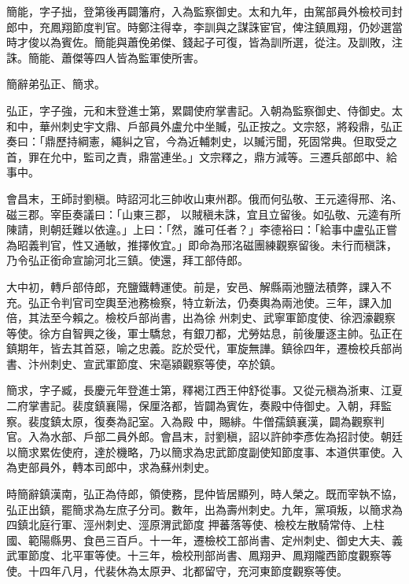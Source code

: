 \begin{pinyinscope}
 簡能，字子拙，登第後再闢籓府，入為監察御史。太和九年，由駕部員外檢校司封郎中，充鳳翔節度判官。時鄭注得幸，李訓與之謀誅宦官，俾注鎮鳳翔，仍妙選當時才俊以為賓佐。簡能與蕭俛弟傑、錢起子可復，皆為訓所選，從注。及訓敗，注誅。簡能、蕭傑等四人皆為監軍使所害。



 簡辭弟弘正、簡求。



 弘正，字子強，元和末登進士第，累闢使府掌書記。入朝為監察御史、侍御史。太和中，華州刺史宇文鼎、戶部員外盧允中坐贓，弘正按之。文宗怒，將殺鼎，弘正奏曰：「鼎歷持綱憲，繩糾之官，今為近輔刺史，以贓污聞，死固常典。但取受之首，罪在允中，監司之責，鼎當連坐。」文宗釋之，鼎方減等。三遷兵部郎中、給事中。



 會昌末，王師討劉稹。時詔河北三帥收山東州郡。俄而何弘敬、王元逵得邢、洺、磁三郡。宰臣奏議曰：「山東三郡，
 以賊稹未誅，宜且立留後。如弘敬、元逵有所陳請，則朝廷難以依違。」上曰：「然，誰可任者？」李德裕曰：「給事中盧弘正嘗為昭義判官，性又通敏，推擇攸宜。」即命為邢洺磁團練觀察留後。未行而稹誅，乃令弘正銜命宣諭河北三鎮。使還，拜工部侍郎。



 大中初，轉戶部侍郎，充鹽鐵轉運使。前是，安邑、解縣兩池鹽法積弊，課入不充。弘正令判官司空輿至池務檢察，特立新法，仍奏輿為兩池使。三年，課入加倍，其法至今賴之。檢校戶部尚書，出為徐
 州刺史、武寧軍節度使、徐泗濠觀察等使。徐方自智興之後，軍士驕怠，有銀刀都，尤勞姑息，前後屢逐主帥。弘正在鎮期年，皆去其首惡，喻之忠義。訖於受代，軍旋無譁。鎮徐四年，遷檢校兵部尚書、汴州刺史、宣武軍節度、宋亳潁觀察等使，卒於鎮。



 簡求，字子臧，長慶元年登進士第，釋褐江西王仲舒從事。又從元稹為浙東、江夏二府掌書記。裴度鎮襄陽，保厘洛都，皆闢為賓佐，奏殿中侍御史。入朝，拜監察。裴度鎮太原，復奏為記室。入為殿
 中，賜緋。牛僧孺鎮襄漢，闢為觀察判官。入為水部、戶部二員外郎。會昌末，討劉稹，詔以許帥李彥佐為招討使。朝廷以簡求累佐使府，達於機略，乃以簡求為忠武節度副使知節度事、本道供軍使。入為吏部員外，轉本司郎中，求為蘇州刺史。



 時簡辭鎮漢南，弘正為侍郎，領使務，昆仲皆居顯列，時人榮之。既而宰執不協，弘正出鎮，罷簡求為左庶子分司。數年，出為壽州刺史。九年，黨項叛，以簡求為四鎮北庭行軍、涇州刺史、涇原渭武節度
 押蕃落等使、檢校左散騎常侍、上柱國、範陽縣男、食邑三百戶。十一年，遷檢校工部尚書、定州刺史、御史大夫、義武軍節度、北平軍等使。十三年，檢校刑部尚書、鳳翔尹、鳳翔隴西節度觀察等使。十四年八月，代裴休為太原尹、北都留守，充河東節度觀察等使。




\end{pinyinscope}
